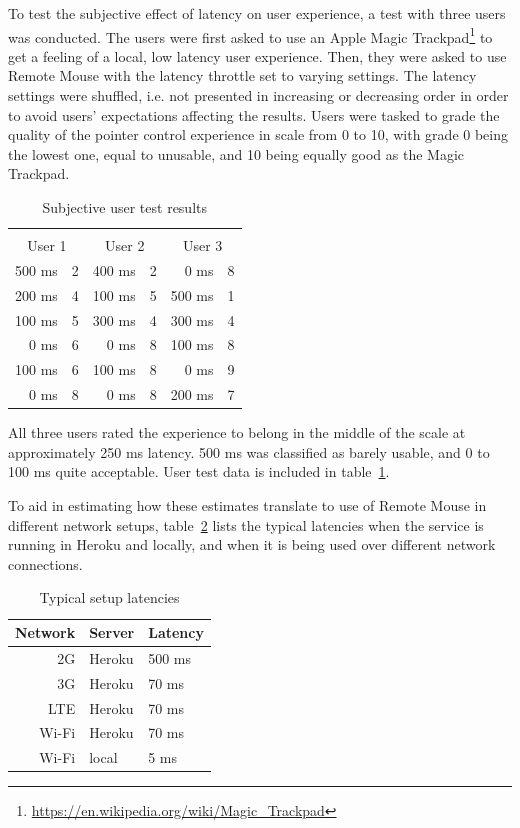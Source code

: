 \documentclass[a4paper,english,twocolumn]{article}
\newcommand*\rot{\rotatebox{90}}
\begin{document}
To test the subjective effect of latency on user experience, a test
with three users was conducted. The users were first asked to use an
Apple Magic
Trackpad\footnote{\url{https://en.wikipedia.org/wiki/Magic_Trackpad}}
to get a feeling of a local, low latency user experience. Then, they
were asked to use Remote Mouse with the latency throttle set to
varying settings. The latency settings were shuffled, i.e. not
presented in increasing or decreasing order in order to avoid users'
expectations affecting the results. Users were tasked to grade the
quality of the pointer control experience in scale from 0 to 10, with
grade 0 being the lowest one, equal to unusable, and 10 being equally
good as the Magic Trackpad.

\begin{table} \centering
  \begin{tabular}{rlrlrl}
    \rot{Latency} & \rot{Grade} & \rot{Latency} & \rot{Grade} & \rot{Latency} & \rot{Grade} \\
    \multicolumn{2}{c}{User 1} & \multicolumn{2}{c}{User 2} & \multicolumn{2}{c}{User 3} \\
    \hline
    500 ms & 2  & 400 ms & 2  & 0 ms   & 8 \\
    200 ms & 4  & 100 ms & 5  & 500 ms & 1 \\
    100 ms & 5  & 300 ms & 4  & 300 ms & 4 \\
      0 ms & 6    & 0 ms & 8  & 100 ms & 8 \\
    100 ms & 6  & 100 ms & 8  & 0 ms   & 9 \\
      0 ms & 8    & 0 ms & 8  & 200 ms & 7 \\
    \hline
  \end{tabular}
  \caption{Subjective user test results}
  \label{table:userresults}
\end{table}

All three users rated the experience to belong in the middle of the
scale at approximately 250 ms latency. 500 ms was classified as barely
usable, and 0 to 100 ms quite acceptable. User test data is included
in table~\ref{table:userresults}.

To aid in estimating how these estimates translate to use of Remote
Mouse in different network setups, table~\ref{table:setuplatencies}
lists the typical latencies when the service is running in Heroku and
locally, and when it is being used over different network
connections.

\begin{table} \centering
  \begin{tabular}{rll}
    Network & Server & Latency \\
    \hline
    2G & Heroku    & 500 ms \\
    3G & Heroku    & 70 ms \\
    LTE & Heroku   & 70 ms \\
    Wi-Fi & Heroku & 70 ms \\
    Wi-Fi & local  & 5 ms \\
    \hline
  \end{tabular}
  \caption{Typical setup latencies}
  \label{table:setuplatencies}
\end{table}
\end{document}
